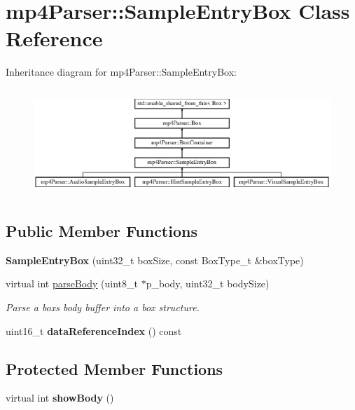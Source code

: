 \hypertarget{classmp4_parser_1_1_sample_entry_box}{}\section{mp4\+Parser\+::Sample\+Entry\+Box Class Reference}
\label{classmp4_parser_1_1_sample_entry_box}
Inheritance diagram for mp4\+Parser\+::Sample\+Entry\+Box\+:\begin{figure}[H]
\begin{center}
\leavevmode
\includegraphics[height=4.075692cm]{classmp4_parser_1_1_sample_entry_box}
\end{center}
\end{figure}
\subsection*{Public Member Functions}
\begin{DoxyCompactItemize}
\item 
\mbox{\label{classmp4_parser_1_1_sample_entry_box_a27b97d7b4dad7592a139c6e327826858}} 
{\bfseries Sample\+Entry\+Box} (uint32\+\_\+t box\+Size, const Box\+Type\+\_\+t \&box\+Type)
\item 
virtual int \mbox{\hyperlink{classmp4_parser_1_1_sample_entry_box_a8ff77bc115eb18deee12619ebfc0eaa6}{parse\+Body}} (uint8\+\_\+t $\ast$p\+\_\+body, uint32\+\_\+t body\+Size)
\begin{DoxyCompactList}\small\item\em Parse a box\textquotesingle{}s body buffer into a box structure. \end{DoxyCompactList}\item 
\mbox{\label{classmp4_parser_1_1_sample_entry_box_a00d5397d2d5ed629330dcf3c4c06db92}} 
uint16\+\_\+t {\bfseries data\+Reference\+Index} () const
\end{DoxyCompactItemize}
\subsection*{Protected Member Functions}
\begin{DoxyCompactItemize}
\item 
\mbox{\label{classmp4_parser_1_1_sample_entry_box_a0291a4d6dc1644bd0bef618fbd0dc518}} 
virtual int {\bfseries show\+Body} ()
\end{DoxyCompactItemize}

